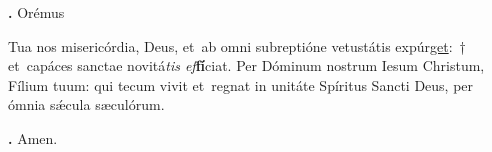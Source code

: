 \textbf{\Vbar.} Orémus

Tua nos misericórdia, Deus, et~ab omni subreptióne vetustátis expúr\underline{get}:~† et~capáces sanctae novitá\textit{tis ef}\textbf{fí}ciat.
Per Dóminum nostrum Iesum Christum, Fílium tuum: qui tecum vivit et~regnat in unitáte Spíritus Sancti Deus, per ómnia s\'{\ae}cula sæculórum.

\textbf{\Rbar.} Amen.

